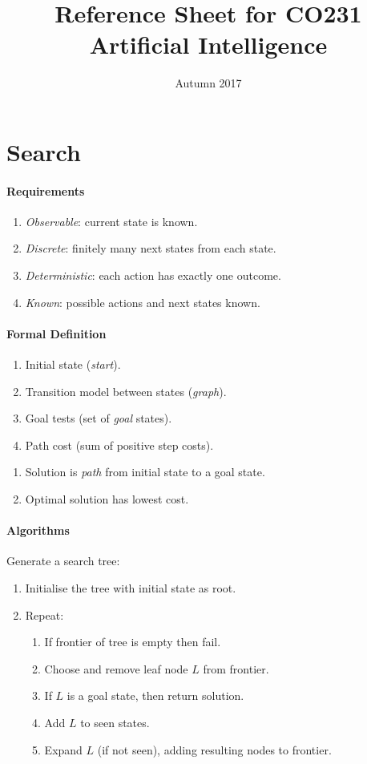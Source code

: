 \documentclass[twocolumn,english]{article}
\begin{document}
\title{Reference Sheet for CO231 Artificial Intelligence}

\date{Autumn 2017}
\maketitle

\section{Search}

\paragraph{Requirements}
\begin{enumerate}
\item \emph{Observable}: current state is known.
\item \emph{Discrete}: finitely many next states from each state.
\item \emph{Deterministic}: each action has exactly one outcome.
\item \emph{Known}: possible actions and next states known.
\end{enumerate}

\paragraph{Formal Definition}
\begin{enumerate}
\item Initial state (\emph{start}).
\item Transition model between states (\emph{graph}).
\item Goal tests (set of \emph{goal} states).
\item Path cost (sum of positive step costs).
\end{enumerate}
%
\begin{enumerate}
\item Solution is \emph{path} from initial state to a goal state.
\item Optimal solution has lowest cost.
\end{enumerate}

\paragraph{Algorithms}

Generate a search tree:
\begin{enumerate}
\item Initialise the tree with initial state as root.
\item Repeat:
\begin{enumerate}
\item If frontier of tree is empty then fail.
\item Choose and remove leaf node $L$ from frontier.
\item If $L$ is a goal state, then return solution.
\item Add $L$ to seen states.
\item Expand $L$ (if not seen), adding resulting nodes to frontier.
\end{enumerate}
\end{enumerate}
\end{document}
